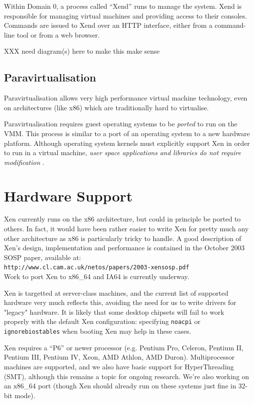 \documentclass[11pt,twoside,final,openright]{xenstyle}
\begin{document}
Within Domain 0, a process called ``Xend'' runs to manage the system.
Xend is responsible for managing virtual machines and providing access
to their consoles.  Commands are issued to Xend over an HTTP
interface, either from a command-line tool or from a web browser.

XXX need diagram(s) here to make this make sense

\subsection{Paravirtualisation}

Paravirtualisation allows very high performance virtual machine
technology, even on architectures (like x86) which are traditionally
hard to virtualise.

Paravirtualisation requires guest operating systems to be { \em ported
} to run on the VMM.  This process is similar to a port of an
operating system to a new hardware platform.  Although operating
system kernels must explicitly support Xen in order to run in a
virtual machine, { \em user space applications and libraries
do not require modification }.

\section{Hardware Support}

Xen currently runs on the x86 architecture, but could in principle be
ported to others. In fact, it would have been rather easier to write
Xen for pretty much any other architecture as x86 is particularly
tricky to handle. A good description of Xen's design, implementation
and performance is contained in the October 2003 SOSP paper, available
at:\\
{\tt http://www.cl.cam.ac.uk/netos/papers/2003-xensosp.pdf}\\
Work to port Xen to x86\_64 and IA64 is currently underway.

Xen is targetted at server-class machines, and the current list of
supported hardware very much reflects this, avoiding the need for us
to write drivers for "legacy" hardware. It is likely that some desktop
chipsets will fail to work properly with the default Xen
configuration: specifying {\tt noacpi} or {\tt ignorebiostables} when
booting Xen may help in these cases.

Xen requires a ``P6'' or newer processor (e.g. Pentium Pro, Celeron,
Pentium II, Pentium III, Pentium IV, Xeon, AMD Athlon, AMD Duron).
Multiprocessor machines are supported, and we also have basic support
for HyperThreading (SMT), although this remains a topic for ongoing
research. We're also working on an x86\_64 port (though Xen should
already run on these systems just fine in 32-bit mode).
\end{document}
